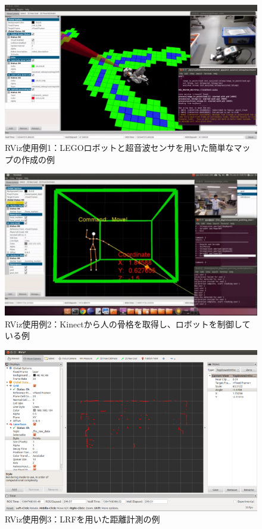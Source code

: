 \begin{figure}[h]
  \centering
  \includegraphics[width=\columnwidth]{pictures/chapter5/pic_05_01.png}
  \caption{RViz使用例1：LEGOロボットと超音波センサを用いた簡単なマップの作成の例}
\end{figure}

\begin{figure}[h]
  \centering
  \includegraphics[width=\columnwidth]{pictures/chapter5/pic_05_02.png}
  \caption{RViz使用例2：Kinectから人の骨格を取得し、ロボットを制御している例}
\end{figure}

\begin{figure}[h]
  \centering
  \includegraphics[width=\columnwidth]{pictures/chapter5/pic_05_03.png}
  \caption{RViz使用例3：LRFを用いた距離計測の例}
\end{figure}

